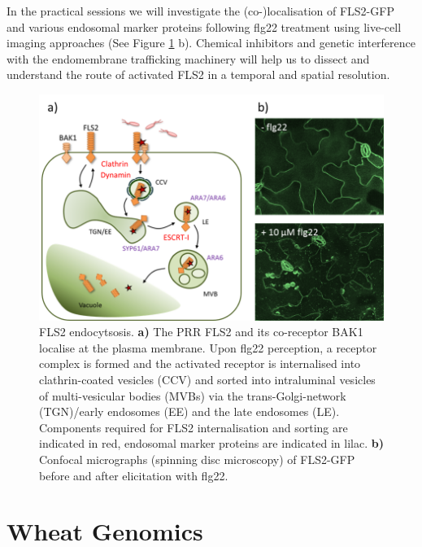 \documentclass[12pt,]{book}
\begin{document}
In the practical sessions we will investigate the (co-)localisation of
FLS2-GFP and various endosomal marker proteins following flg22 treatment
using live-cell imaging approaches (See Figure \ref{fig:srfig} b).
Chemical inhibitors and genetic interference with the endomembrane
trafficking machinery will help us to dissect and understand the route
of activated FLS2 in a temporal and spatial resolution.












\begin{figure}
\includegraphics[width=5.72in]{assets/sr_fig1_prac} \caption{FLS2 endocytsosis. \textbf{a)} The PRR FLS2 and its
co-receptor BAK1 localise at the plasma membrane. Upon flg22 perception,
a receptor complex is formed and the activated receptor is internalised
into clathrin-coated vesicles (CCV) and sorted into intraluminal
vesicles of multi-vesicular bodies (MVBs) via the trans-Golgi-network
(TGN)/early endosomes (EE) and the late endosomes (LE). Components
required for FLS2 internalisation and sorting are indicated in red,
endosomal marker proteins are indicated in lilac. \textbf{b)} Confocal
micrographs (spinning disc microscopy) of FLS2-GFP before and after
elicitation with flg22.}\label{fig:srfig}
\end{figure}

\chapter*{Wheat Genomics}\label{wheat-genomics}
\end{document}
